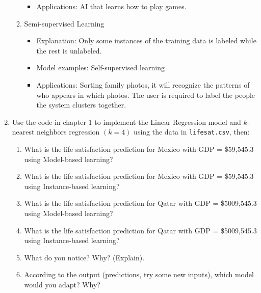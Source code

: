\documentclass[a4paper,10pt]{article}
\begin{document}
\begin{enumerate}
\begin{enumerate}
\begin{itemize}
			\item Applications:
			AI that learns how to play games. 
		\end{itemize}
		\item Semi-supervised Learning
		\begin{itemize}
			\item Explanation:
			Only some instances of the training data is labeled while the rest is unlabeled.
			\item Model examples:
			Self-supervised learning
			\item Applications:
			Sorting family photos, it will recognize the patterns of who appears in which photos. The user is required to label the people the system clusters together.
		\end{itemize}
	\end{enumerate}
	
	\item Use the code in chapter 1 to implement the Linear Regression model and \( k \)-nearest neighbors regression \( (k=4) \) using the data in \texttt{lifesat.csv}, then:
	\begin{enumerate}
		\item What is the life satisfaction prediction for Mexico with GDP = \$59,545.3 using Model-based learning?
		\item What is the life satisfaction prediction for Mexico with GDP = \$59,545.3 using Instance-based learning?
		\item What is the life satisfaction prediction for Qatar with GDP = \$5009,545.3 using Model-based learning?
		\item What is the life satisfaction prediction for Qatar with GDP = \$5009,545.3
		using Instance-based learning?
		\item What do you notice? Why? (Explain).
		\item According to the output (predictions, try some new inputs), which model would you adapt? Why?
	\end{enumerate}
	

\end{enumerate}
\end{document}
